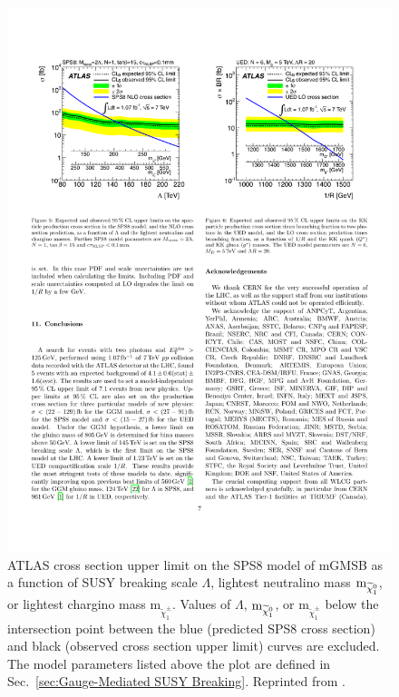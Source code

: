 \documentclass[dissertation.tex]{subfiles}
\begin{document}
\begin{figure}
	\centering
	\includegraphics[scale=0.9]{ATLAS_SPS8_limit}
	\caption{ATLAS cross section upper limit on the SPS8 \cite{SPS} model of mGMSB as a function of SUSY breaking scale $\Lambda$, lightest neutralino mass $\mbox{m}_{\widetilde{\chi}_{1}^{0}}$, or lightest chargino mass $\mbox{m}_{\widetilde{\chi}_{1}^{\pm}}$.  Values of $\Lambda$, $\mbox{m}_{\widetilde{\chi}_{1}^{0}}$, or $\mbox{m}_{\widetilde{\chi}_{1}^{\pm}}$ below the intersection point between the blue (predicted SPS8 cross section) and black (observed cross section upper limit) curves are excluded.  The model parameters listed above the plot are defined in Sec.~\ref{sec:Gauge-Mediated SUSY Breaking}.  Reprinted from \cite{ATLAS_GMSB_1fb-1}.}
	\label{fig:ATLAS_SPS8_limit}
\end{figure}
\end{document}
